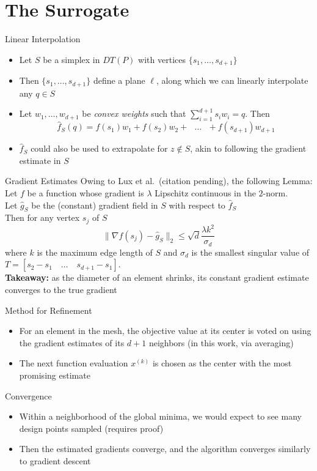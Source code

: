 \documentclass[xcolor=dvipsnames]{beamer}
\begin{document}
\section{The Surrogate}
\begin{frame}{Linear Interpolation}
\begin{itemize}
\item Let $S$ be a simplex in $DT(P)$ with vertices $\{s_1,\ldots,s_{d+1}\}$
\item Then $\{s_1,\ldots,s_{d+1}\}$ define a plane $\ell$, along which we
can linearly interpolate any $q\in S$
\item Let $w_1,\ldots,w_{d+1}$ be {\it convex weights} such that
$\sum_{i=1}^{d+1} s_i w_i = q$. Then
$$
\hat{f}_S (q) = f(s_1) w_1 + f(s_2) w_2 + \text{ $\ldots$ } + f(s_{d+1})w_{d+1}
$$
\pause
\item $\hat{f}_S$ could also be used to extrapolate for $z \not\in S$, akin
to following the gradient estimate in $S$
\end{itemize}
\end{frame}
\begin{frame}{Gradient Estimates}
Owing to Lux et al.\ (citation pending), the following Lemma:\\
\medskip
Let $f$ be a function whose gradient is $\lambda$ Lipschitz continuous in
the $2$-norm.\\
\smallskip
Let ${\hat g}_S$ be the (constant) gradient field in $S$ with respect to
${\hat f}_S$\\
\smallskip
Then for any vertex $s_j$ of $S$
$$
\|\nabla f(s_j) - {\hat g}_S\|_2 \leq \sqrt{d}\frac{\lambda k^2}{\sigma_d}
$$
where $k$ is the maximum edge length of $S$ and $\sigma_d$ is the smallest
singular value of 
$T = \left[ s_2-s_1\quad \ldots\quad s_{d+1}-s_1 \right]$.\\
\smallskip
{\bf Takeaway:} as the diameter of an element shrinks, its constant gradient
estimate converges to the true gradient
\end{frame}

\begin{frame}{Method for Refinement}
\begin{itemize}
\item For an element in the mesh, the objective value at its center is
voted on using the gradient estimates of its $d+1$ neighbors
(in this work, via averaging)
\item The next function evaluation $x^{(k)}$ is chosen as the center with
the most promising estimate
\end{itemize}
\end{frame}
\begin{frame}{Convergence}
\begin{itemize}
\item Within a neighborhood of the global minima, we would expect to see
many design points sampled (requires proof)
\item Then the estimated gradients converge, and the algorithm converges
similarly to gradient descent
\end{itemize}
\end{frame}
\end{document}

